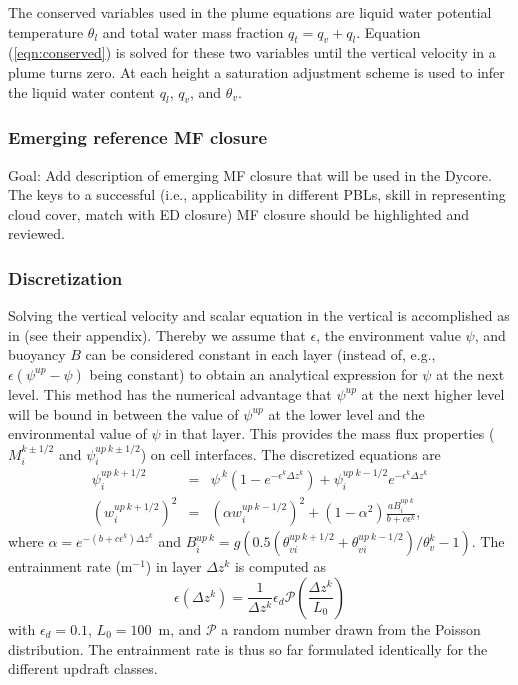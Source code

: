 \documentclass[dvipdfmx,a4paper,10pt]{article}
\begin{document}
The conserved variables used in the plume equations are liquid water potential temperature $\theta_l$ and total water mass fraction $q_t=q_v+q_l$. Equation (\ref{eqn:conserved}) is solved for these two variables until the vertical velocity in a plume turns zero. At each height a saturation adjustment scheme is used to infer the liquid water content $q_l$, $q_v$, and $\theta_v$. 

\subsubsection{Emerging reference MF closure}

{\color{blue} Goal: Add description of emerging MF closure that will be used in the Dycore. The keys to a successful (i.e., applicability in different PBLs, skill in representing cloud cover, match with ED closure) MF closure should be highlighted and reviewed.}

\subsubsection{Discretization}
Solving the vertical velocity and scalar equation in the vertical is accomplished as in \cite{suselj14} (see their appendix). Thereby we assume that $\epsilon$, the environment value $\psi$, and buoyancy $B$ can be considered constant in each layer (instead of, e.g., $\epsilon(\psi^{up}-\psi)$ being constant) to obtain an analytical expression for $\psi$ at the next level. This method has the numerical advantage that $\psi^{up}$ at the next higher level will be bound in between the value of $\psi^{up}$ at the lower level and the environmental value of $\psi$ in that layer. This provides the mass flux properties ($M_i^{k\pm 1/2}$ and $\psi^{up~k\pm 1/2}_i$) on cell interfaces. The discretized equations are 
\begin{eqnarray}
 \psi_i^{up~k+1/2}&=&\psi^{~k}(1-e^{-\epsilon^{k}\Delta z^k})+\psi_i^{up~k-1/2}e^{-\epsilon^{k}\Delta z^k}\\
 (w_i^{up~k+1/2})^2&=&(\alpha w_i^{up~k-1/2})^2 + (1-\alpha^2) \frac{aB_i^{up~k}}{b+c\epsilon^k},
\end{eqnarray}
where $\alpha=e^{-(b+c\epsilon^k)\Delta z^k}$ and $B_i^{up~k}=g(0.5(\theta_{vi}^{up~k+1/2}+\theta_{vi}^{up~k-1/2})/\theta_v^{k}-1)$. The entrainment rate (m$^{-1}$) in layer $\Delta z^k$ is computed as
\begin{equation}
 \epsilon(\Delta z^k) = \frac{1}{\Delta z^k} \epsilon_d \mathcal{P}(\frac{\Delta z^k}{L_0})
\end{equation}
with $\epsilon_d=0.1$, $L_0=100$~m, and $\mathcal{P}$ a random number drawn from the Poisson distribution. The entrainment rate is thus so far formulated identically for the different updraft classes. 
\end{document}
